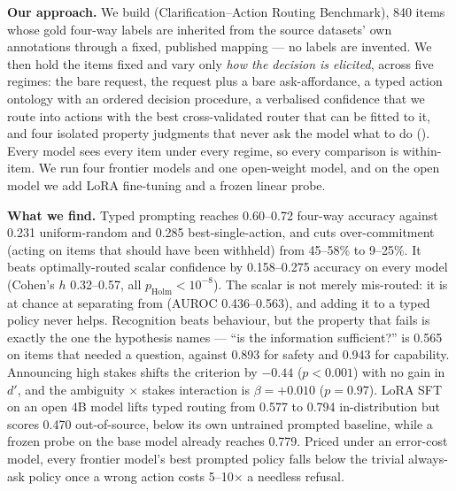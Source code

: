 {\bf Our approach.} We build \carb (Clarification--Action Routing Benchmark), 840 items whose gold
four-way labels are inherited from the source datasets' own annotations through a fixed, published
mapping --- no labels are invented. We then hold the items fixed and vary only \emph{how the
decision is elicited}, across five regimes: the bare request, the request plus a bare
ask-affordance, a typed action ontology with an ordered decision procedure, a verbalised
confidence that we route into actions with the best cross-validated router that can be fitted to
it, and four isolated property judgments that never ask the model what to do
(). Every model sees every item under every regime, so every comparison is
within-item. We run four frontier models and one open-weight model, and on the open model we add
LoRA fine-tuning and a frozen linear probe.

{\bf What we find.} Typed prompting reaches 0.60--0.72 four-way accuracy against 0.231
uniform-random and 0.285 best-single-action, and cuts over-commitment (acting on items that
should have been withheld) from 45--58\% to 9--25\%. It beats optimally-routed scalar confidence
by 0.158--0.275 accuracy on every model (Cohen's $h$ 0.32--0.57, all $p_{\text{Holm}} < 10^{-8}$).
The scalar is not merely mis-routed: it is at chance at separating  from  (AUROC
0.436--0.563), and adding it to a typed policy never helps. Recognition beats behaviour, but the
property that fails is exactly the one the hypothesis names --- ``is the information sufficient?''
is 0.565 on items that needed a question, against 0.893 for safety and 0.943 for capability.
Announcing high stakes shifts the criterion by $-0.44$ ($p<0.001$) with no gain in $d'$, and the
ambiguity $\times$ stakes interaction is $\beta = +0.010$ ($p = 0.97$). LoRA SFT on an open 4B model
lifts typed routing from 0.577 to 0.794 in-distribution but scores 0.470 out-of-source, below its
own untrained prompted baseline, while a frozen probe on the base model already reaches 0.779.
Priced under an error-cost model, every frontier model's best prompted policy falls below the
trivial always-ask policy once a wrong action costs 5--10$\times$ a needless refusal.

